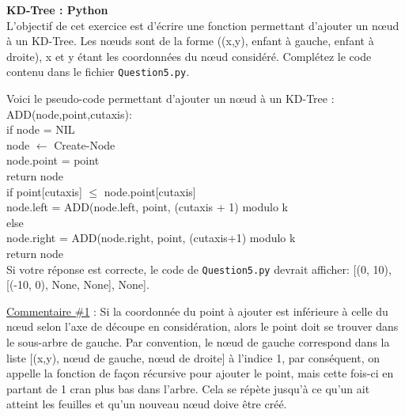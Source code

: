 \begin{Exercice}[15 minutes]\textbf{KD-Tree : Python}\\

L'objectif de cet exercice est d'écrire une fonction permettant d'ajouter un nœud à un KD-Tree. Les nœuds sont de la forme ((x,y), enfant à gauche, enfant à droite), x et y étant les coordonnées du nœud considéré. Complétez le code contenu dans le fichier \lstinline{Question5.py}.\\

\begin{conseil}
Voici le pseudo-code permettant d'ajouter un nœud à un KD-Tree :\\

ADD(node,point,cutaxis):\\
    \tabto{1cm}if node = NIL\\
        \tabto{2cm}node $\leftarrow$ Create-Node\\
        \tabto{2cm}node.point = point\\
        \tabto{2cm}return node\\
    \tabto{1cm}if point[cutaxis] $\leq$ node.point[cutaxis]\\
    \tabto{2cm} node.left = ADD(node.left, point, (cutaxis + 1) modulo k\\
    \tabto{1cm} else\\
    \tabto{2cm} node.right = ADD(node.right, point, (cutaxis+1) modulo k\\
    \tabto{1cm} return node\\
    
    Si votre réponse est correcte, le code de \lstinline{Question5.py} devrait afficher: [(0, 10), [(-10, 0), None, None], None].
\end{conseil}

\begin{solution}
    

    \underline{Commentaire \#1} : Si la coordonnée du point à ajouter est inférieure à celle du nœud selon l'axe de découpe en considération, alors le point doit se trouver dans le sous-arbre de gauche. Par convention, le nœud de gauche correspond dans la liste [(x,y), nœud de gauche, nœud de droite] à l'indice 1, par conséquent, on appelle la fonction de façon récursive pour ajouter le point, mais cette fois-ci en partant de 1 cran plus bas dans l'arbre. Cela se répète jusqu'à ce qu'un ait atteint les feuilles et qu'un nouveau nœud doive être créé.

\end{solution}
\end{Exercice}

